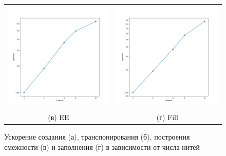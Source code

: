 \documentclass[12pt, a4paper]{article}
\begin{document}
\begin{figure}[H]
\begin{tabular}{cc}
		\includegraphics[width=85mm]{2025/boost_adjacency} & \includegraphics[width=85mm]{2025/boost_fill} \\
		(в) EE & (г) Fill \\[6pt]
	\end{tabular}
	\caption{Ускорение создания (а), транспонирования (б), построения смежности (в) и заполнения (г) в зависимости от числа нитей} 
	\label{fig:gridd}
\end{figure}
\end{document}

